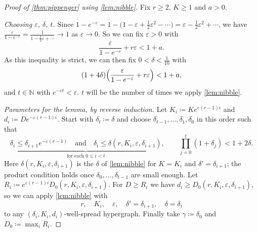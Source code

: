 \begin{proof}[Proof of \autoref{thm:pippenger} using \autoref{lem:nibble}]
    Fix \(r \ge 2\), \(K \ge 1\) and \(a > 0\).

    \emph{Choosing \(\varepsilon\), \(\delta\), \(t\).} Since \(1 - e^{-\varepsilon} = 1 - \bigl( 1 - \varepsilon + \frac{1}{2}\varepsilon^{2} - \cdots \bigr) = \varepsilon - \frac{1}{2}\varepsilon^{2} + \cdots\), we have \(\frac{\varepsilon}{1 - e^{-\varepsilon}} = \frac{1}{1 - \frac{1}{2}\varepsilon + \cdots} \to 1\) as \(\varepsilon \to 0\). So we can fix \(\varepsilon > 0\) with
    \[
        \frac{\varepsilon}{1 - e^{-\varepsilon}} + r \varepsilon < 1 + a .
    \]
    As this inequality is strict, we can then fix \(0 < \delta < \frac{1}{10}\) with
    \begin{equation}\label{eq:pippenger-delta}
        (1 + 4\delta) \Bigl( \frac{\varepsilon}{1 - e^{-\varepsilon}} + r \varepsilon \Bigr) < 1 + a ,
    \end{equation}
    and \(t \in \mathbb{N}\) with \(e^{-\varepsilon t} < \varepsilon\). \(t\) will be the number of times we apply \autoref{lem:nibble}.

    \emph{Parameters for the lemma, by reverse induction.} Let \(K_{i} \coloneqq K e^{\varepsilon(r-1) i}\) and \(d_{i} \coloneqq D e^{-\varepsilon(r-1) i}\). Start with \(\delta_{t} \coloneqq \delta\) and choose \(\delta_{t-1}, \ldots, \delta_{1}, \delta_{0}\) in this order such that
    \begin{equation}\label{eq:pippenger-deltas}
        \underbrace{\delta_{i} \le \delta_{i+1} e^{-\varepsilon(r-1)}
        \quad\text{and}\quad
        \delta_{i} \le \delta(r, K_{i}, \varepsilon, \delta_{i+1})}_{\text{for each } 0 \le i < t},
        \qquad
        \prod_{j=0}^{t} (1 + \delta_{j}) < 1 + 2\delta .
    \end{equation}
    Here \(\delta(r, K_{i}, \varepsilon, \delta_{i+1})\) is the \(\delta\) of \autoref{lem:nibble} for \(K = K_{i}\) and \(\delta' = \delta_{i+1}\); the product condition holds once \(\delta_{0}, \ldots, \delta_{t-1}\) are small enough. Let \(R_{i} \coloneqq e^{\varepsilon(r-1)i} D_{0}(r, K_{i}, \varepsilon, \delta_{i+1})\). For \(D \ge R_{i}\) we have \(d_{i} \ge D_{0}(r, K_{i}, \varepsilon, \delta_{i+1})\), so we can apply \autoref{lem:nibble} with
    \[
        r, \quad K_{i}, \quad \varepsilon, \quad \delta' = \delta_{i+1}, \quad \delta = \delta_{i}
    \]
    to any \((\delta_{i}, K_{i}, d_{i})\)-well-spread hypergraph. Finally take \(\gamma \coloneqq \delta_{0}\) and \(D_{0} \coloneqq \max_{i} R_{i}\).


\end{proof}
